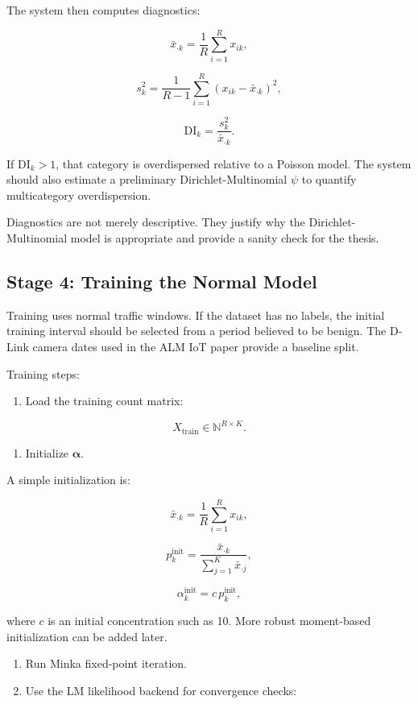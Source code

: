 \documentclass[11pt,a4paper]{article}
\begin{document}
The system then computes diagnostics:

\[
\bar{x}_{\cdot k}=\frac{1}{R}\sum_{i=1}^{R}x_{ik},
\]

\[
s_k^2=\frac{1}{R-1}\sum_{i=1}^{R}\left(x_{ik}-\bar{x}_{\cdot k}\right)^2,
\]

\[
\mathrm{DI}_k
=
\frac{s_k^2}{\bar{x}_{\cdot k}}.
\]

If \(\mathrm{DI}_k>1\), that category is overdispersed relative to a Poisson model. The system should also estimate a preliminary Dirichlet-Multinomial \(\psi\) to quantify multicategory overdispersion.

Diagnostics are not merely descriptive. They justify why the Dirichlet-Multinomial model is appropriate and provide a sanity check for the thesis.

\subsection{Stage 4: Training the Normal Model}

Training uses normal traffic windows. If the dataset has no labels, the initial training interval should be selected from a period believed to be benign. The D-Link camera dates used in the ALM IoT paper provide a baseline split.

Training steps:

\begin{enumerate}
  \item Load the training count matrix:
\end{enumerate}

\[
X_{\mathrm{train}}\in\mathbb{N}^{R\times K}.
\]

\begin{enumerate}[resume]
  \item Initialize \(\boldsymbol{\alpha}\).
\end{enumerate}

A simple initialization is:

\[
\bar{x}_{\cdot k}
=
\frac{1}{R}\sum_{i=1}^{R}x_{ik},
\]

\[
p_k^{\mathrm{init}}
=
\frac{\bar{x}_{\cdot k}}
{\sum_{j=1}^{K}\bar{x}_{\cdot j}},
\]

\[
\alpha_k^{\mathrm{init}}=c\,p_k^{\mathrm{init}},
\]

where \(c\) is an initial concentration such as 10. More robust moment-based initialization can be added later.

\begin{enumerate}[resume]
  \item Run Minka fixed-point iteration.
  \item Use the LM likelihood backend for convergence checks:
\end{enumerate}
\end{document}
